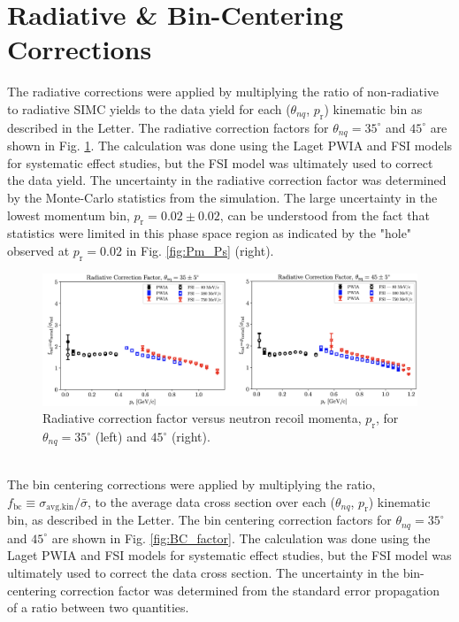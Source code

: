 \documentclass[aps, prl]{revtex4-2}  %
\begin{document}
\section{\large Radiative \& Bin-Centering Corrections}
\indent The radiative corrections were applied by multiplying the ratio of non-radiative to radiative SIMC yields to the data yield for each ($\theta_{nq}$, $p_{\mathrm{r}}$)
kinematic bin as described in the Letter. The radiative correction factors for $\theta_{nq}=35^{\circ}$ and $45^{\circ}$ are shown in Fig. \ref{fig:RC_factor}. The calculation was done using the
Laget PWIA and FSI models for systematic effect studies, but the FSI model was ultimately used to correct the data yield. The uncertainty in the radiative
correction factor was determined by the Monte-Carlo statistics from the simulation. The large uncertainty in the lowest momentum bin, $p_{\mathrm{r}} = 0.02\pm0.02$, can
be understood from the fact that statistics were limited in this phase space region as indicated by the "hole" observed at $p_{\mathrm{r}} = 0.02$ in Fig. \ref{fig:Pm_Ps} (right). 
\begin{figure}[!h]
\includegraphics[scale=0.26]{plots/RC_factor.png}
\caption{Radiative correction factor versus neutron recoil momenta, $p_{\mathrm{r}}$, for $\theta_{nq}=35^{\circ}$ (left) and $45^{\circ}$ (right). }
\label{fig:RC_factor}
\end{figure}\\
The bin centering corrections were applied by multiplying the ratio, $f_{\mathrm{bc}} \equiv \sigma_{\mathrm{avg.kin}}/\bar{\sigma}$, to the average data cross section over each ($\theta_{nq}$, $p_{\mathrm{r}}$)
kinematic bin, as described in the Letter. The bin centering correction factors for $\theta_{nq}=35^{\circ}$ and $45^{\circ}$ are shown in
Fig. \ref{fig:BC_factor}. The calculation was done using the Laget PWIA and FSI models for systematic effect studies, but the FSI model was ultimately used to correct the data cross section. The
uncertainty in the bin-centering correction factor was determined from the standard error propagation of a ratio between two quantities. 
\end{document}

